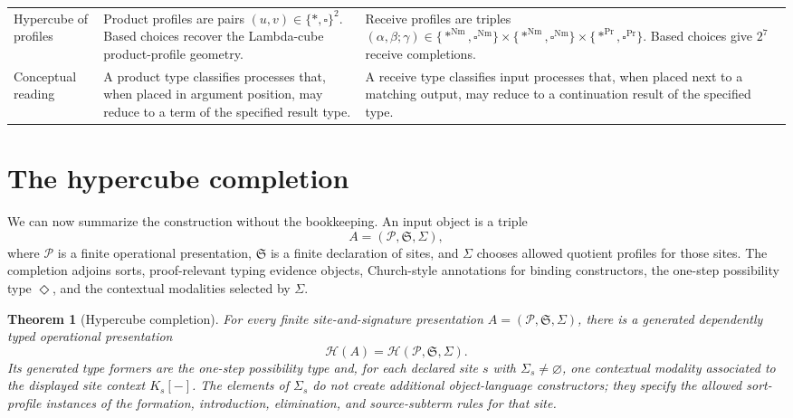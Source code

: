 \documentclass[11pt]{article}
\newcommand{\Proc}{\mathrm{Pr}}
\newcommand{\Nm}{\mathrm{Nm}}
\newcommand{\Dia}{\Diamond}
\newcommand{\Sig}{\Sigma}
\newtheorem{theorem}[definition]{Theorem}
\begin{document}
\begin{center}
\begin{tabularx}{\textwidth}{@{}p{}XX@{}}
Hypercube of profiles
&
Product profiles are pairs \((u,v)\in\{\ast,\square\}^2\).  Based choices
recover the Lambda-cube product-profile geometry.
&
Receive profiles are triples
\((\alpha,\beta;\gamma)\in
\{\ast^{\Nm},\square^{\Nm}\}
\times
\{\ast^{\Nm},\square^{\Nm}\}
\times
\{\ast^{\Proc},\square^{\Proc}\}\).
Based choices give \(2^7\) receive completions.
\\

Conceptual reading
&
A product type classifies processes that, when placed in argument position,
may reduce to a term of the specified result type.
&
A receive type classifies input processes that, when placed next to a matching
output, may reduce to a continuation result of the specified type.
\\
\bottomrule
\end{tabularx}
\label{tab:lambda-pi-completions}
\end{center}

\section{The hypercube completion}
\label{sec:hypercube-functor}

We can now summarize the construction without the bookkeeping.  An input object
is a triple
\[
  A=(\mathcal P,\mathfrak S,\Sig),
\]
where \(\mathcal P\) is a finite operational presentation, \(\mathfrak S\) is a
finite declaration of sites, and \(\Sig\) chooses allowed quotient profiles for
those sites.  The completion adjoins sorts, proof-relevant typing evidence
objects, Church-style annotations for binding constructors, the one-step
possibility type \(\Dia\), and the contextual modalities selected by \(\Sig\).

\begin{theorem}[Hypercube completion]
For every finite site-and-signature presentation
\(A=(\mathcal P,\mathfrak S,\Sig)\), there is a generated dependently typed
operational presentation
\[
  \mathcal H(A)=\mathcal H(\mathcal P,\mathfrak S,\Sig).
\]
Its generated type formers are the one-step possibility type and, for each
declared site \(s\) with \(\Sig_s\neq\varnothing\), one contextual modality
associated to the displayed site context \(K_s[-]\).  The elements of
\(\Sig_s\) do not create additional object-language constructors; they specify
the allowed sort-profile instances of the formation, introduction,
elimination, and source-subterm rules for that site.
\end{theorem}
\end{document}
